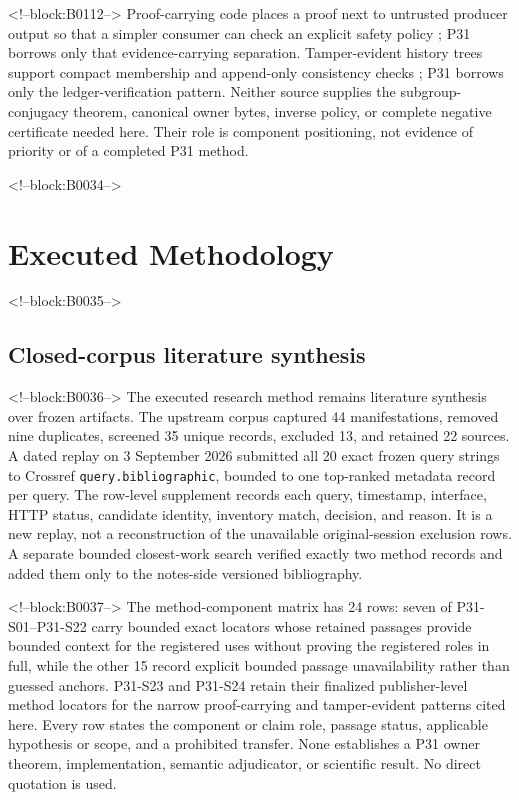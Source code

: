 \documentclass[11pt]{article}
\begin{document}
<!--block:B0112-->
Proof-carrying code places a proof next to untrusted producer output so that a
simpler consumer can check an explicit safety policy \citep{P31-S23}; P31 borrows
only that evidence-carrying separation.  Tamper-evident history trees support
compact membership and append-only consistency checks \citep{P31-S24}; P31
borrows only the ledger-verification pattern.  Neither source supplies the
subgroup-conjugacy theorem, canonical owner bytes, inverse policy, or complete
negative certificate needed here.  Their role is component positioning, not
evidence of priority or of a completed P31 method.

<!--block:B0034-->
\hypertarget{3-executed-methodology}{%
\section{Executed Methodology}\label{3-executed-methodology}}

<!--block:B0035-->
\hypertarget{31-closed-corpus-literature-synthesis}{%
\subsection{Closed-corpus literature
synthesis}\label{31-closed-corpus-literature-synthesis}}

<!--block:B0036-->
The executed research method remains literature synthesis over frozen artifacts.
The upstream corpus captured 44 manifestations, removed nine duplicates, screened
35 unique records, excluded 13, and retained 22 sources.  A dated replay on
3 September 2026 submitted all 20 exact frozen query strings to Crossref
\texttt{query.bibliographic}, bounded to one top-ranked metadata record per query.
The row-level supplement records each query, timestamp, interface, HTTP status,
candidate identity, inventory match, decision, and reason.  It is a new replay,
not a reconstruction of the unavailable original-session exclusion rows.  A
separate bounded closest-work search verified exactly two method records and
added them only to the notes-side versioned bibliography.

<!--block:B0037-->
The method-component matrix has 24 rows: seven of P31-S01--P31-S22
carry bounded exact locators whose retained passages provide bounded context for
the registered uses without proving the registered roles in full, while the other
15 record explicit bounded passage unavailability rather than guessed
anchors. P31-S23 and P31-S24 retain their finalized publisher-level method
locators for the narrow proof-carrying and tamper-evident patterns cited here.
Every row states the component or claim role, passage status, applicable hypothesis
or scope, and a prohibited transfer. None establishes a P31 owner theorem,
implementation, semantic adjudicator, or scientific result. No direct quotation
is used.
\end{document}
